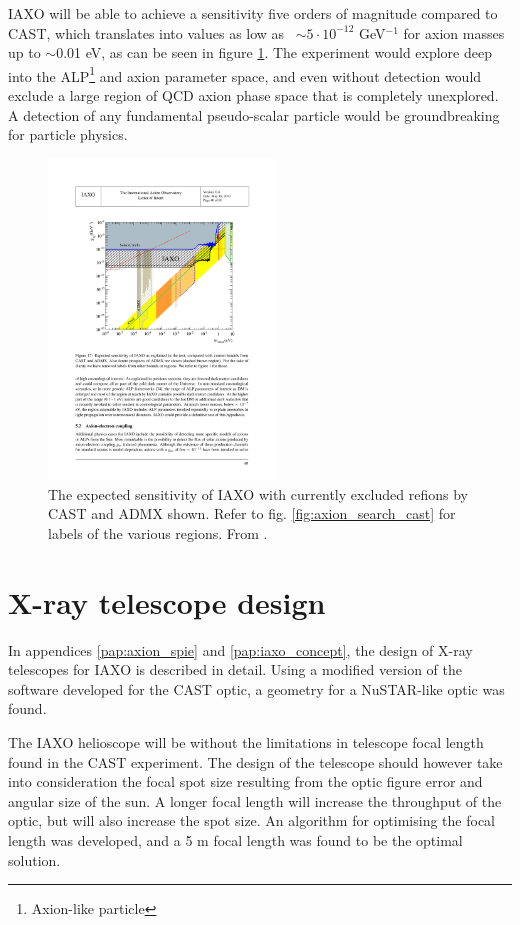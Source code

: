 IAXO will be able to achieve a sensitivity five orders of magnitude compared to CAST, which translates into \gay values as low as \gay\ $\sim5\cdot10^{-12}$ GeV$^{-1}$ for axion masses up to $\sim$0.01 eV, as can be seen in figure \ref{fig:iaxo_search}. The experiment would explore deep into the ALP\footnote{Axion-like particle} and axion parameter space, and even without detection would exclude a large region of QCD axion phase space that is completely unexplored. A detection of any fundamental pseudo-scalar particle would be groundbreaking for particle physics.

\begin{figure}[!h]
  \center
\includegraphics[height=8.5cm]{figures/iaxo/iaxo_axion_search.pdf}
\caption{\footnotesize The expected sensitivity of IAXO with currently excluded refions by CAST and ADMX\cite{Asztalos:2001ty} shown. Refer to fig. \ref{fig:axion_search_cast} for labels of the various regions. From \cite{Irastorza:2013uu}.}\label{fig:iaxo_search}
\end{figure}

\section{X-ray telescope design}
In appendices \ref{pap:axion_spie} and \ref{pap:iaxo_concept}, the design of X-ray telescopes for IAXO is described in detail. Using a modified version of the software developed for the CAST optic, a geometry for a NuSTAR-like optic was found.

The IAXO helioscope will be without the limitations in telescope focal length found in the CAST experiment. The design of
 the telescope should however take into consideration the focal spot size resulting from the optic figure error and angular size of the sun. A longer focal length will increase the throughput of the optic, but will also increase the spot size. An algorithm for optimising the focal length was developed, and a 5 m focal length was found to be the optimal solution.

